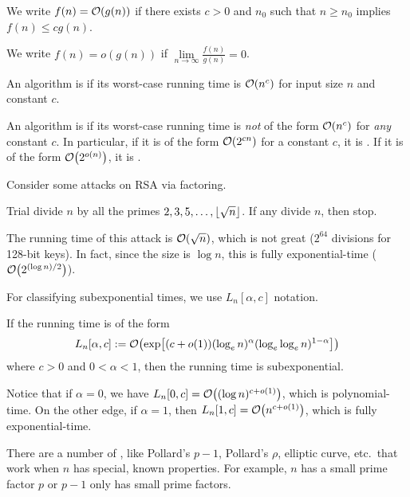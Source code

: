 \documentclass[class=co487,tikz,minted,notes]{agony}
\begin{document}
\begin{defn}
  We write $f(n) = \order{g(n)}$ if there exists $c > 0$ and $n_0$
  such that $n \geq n_0$ implies $f(n) \leq cg(n)$.

  We write $f(n) = o(g(n))$ if $\lim\limits_{n\to\infty}\frac{f(n)}{g(n)} = 0$.

  An algorithm is  if its worst-case running time
  is $\order{n^c}$ for input size $n$ and constant $c$.

  An algorithm is  if its worst-case running time
  is \emph{not} of the form $\order{n^c}$ for \emph{any} constant $c$.
  In particular, if it is of the form $\order{2^{cn}}$ for a constant $c$,
  it is .
  If it is of the form $\order{2^{o(n)}}$, it is .
\end{defn}

Consider some attacks on RSA via factoring.

\begin{attack}
  Trial divide $n$ by all the primes $2,3,5,\dotsc,\lfloor\sqrt{n}\rfloor$.
  If any divide $n$, then stop.
\end{attack}

The running time of this attack is $\order{\sqrt{n}}$, which is not great
($2^{64}$ divisions for 128-bit keys).
In fact, since the size is $\log n$, this is fully exponential-time
($\order{2^{(\log n)/2}}$).

For classifying subexponential times, we use $L_n[\alpha,c]$ notation.

\begin{defn}
  If the running time is of the form
  \[ L_n[\alpha,c] := \order{\exp[(c+o(1))(\log_e n)^\alpha(\log_e\log_e n)^{1-\alpha}]} \]
  where $c > 0$ and $0 < \alpha < 1$, then the running time is subexponential.
\end{defn}

Notice that if $\alpha = 0$, we have $L_n[0,c] = \order{(\log n)^{c+o(1)}}$,
which is polynomial-time.
On the other edge, if $\alpha = 1$, then $L_n[1,c] = \order{n^{c+o(1)}}$,
which is fully exponential-time.

There are a number of ,
like Pollard's $p-1$, Pollard's $\rho$, elliptic curve, etc.\ that work when
$n$ has special, known properties.
For example, $n$ has a small prime factor $p$ or $p-1$ only has small prime factors.
\end{document}

